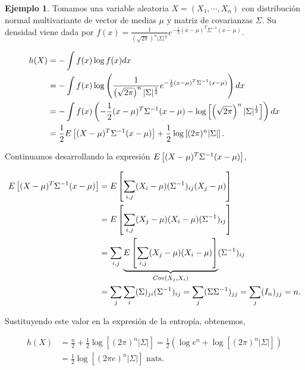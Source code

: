 \documentclass[10pt,a4paper]{article} %
\let\mathbb\relax
\theoremstyle{definition}
\newtheorem{example}[theorem]{Ejemplo}
\begin{document}
\begin{example}\label{ej:norm_multi}
  Tomamos una variable aleatoria $X = (X_1,\cdots,X_n)$ con distribución normal multivariante de vector de medias $\mu$ y matriz de covarianzas $\Sigma$. Su densidad viene dada por $f(x) = \frac{1}{\left (\sqrt{2\pi}\right )^n |\Sigma|^{\frac{1}{2}}} e^{-\frac{1}{2}(x-\mu)^T\Sigma^{-1}(x-\mu)}$.

  \begin{align*}
    h(X) &= - \int f(x)\log f(x) dx \\
    &= - \int f(x) \log \left ( \frac{1}{\left ( \sqrt{2\pi} \right )^n |\Sigma|^{\frac{1}{2}}} e^{-\frac{1}{2}(x-\mu)^T\Sigma^{-1}(x-\mu)} \right )dx\\
    &= - \int f(x) \left (- \frac{1}{2}(x-\mu)^T\Sigma^{-1}(x-\mu) - \log\left [ \left (\sqrt{2\pi} \right )^n |\Sigma|^{\frac{1}{2}} \right ]  \right )dx\\
    &= \frac{1}{2} \mathbb{E}\left [ (X-\mu)^T\Sigma^{-1}(x-\mu) \right ] + \frac{1}{2}\log\left [(2\pi)^n|\Sigma|\right ].
  \end{align*}

  Continuamos desarrollando la expresión $\mathbb{E}\left [ (X-\mu)^T\Sigma^{-1}(x-\mu) \right ]$,

  \begin{align*}
    \mathbb{E}\left [ (X-\mu)^T\Sigma^{-1}(x-\mu) \right ] &= \mathbb{E}\left [ \sum_{i,j}(X_i - \mu)(\Sigma^{-1})_{ij}(X_j-\mu)\right ]\\
    &= \mathbb{E}\left[ \sum_{i,j}(X_j-\mu)(X_i-\mu)(\Sigma^{-1})_{ij}\right]\\
    &= \sum_{i,j}\underbrace{\mathbb{E}\left[ \sum_{i,j}(X_j-\mu)(X_i-\mu)\right]}_{Cov(X_j,X_i)}(\Sigma^{-1})_{ij}\\
    &= \sum_j\sum_i(\Sigma)_{ji}(\Sigma^{-1})_{ij} = \sum_j (\Sigma\Sigma^{-1})_{jj} = \sum_j (I_n)_{jj} = n.
  \end{align*}

  Sustituyendo este valor en la expresión de la entropía, obtenemos,

  \begin{align*}
    h(X) &= \frac{n}{2} + \frac{1}{2}\log\left [ (2\pi)^n|\Sigma|\right ] = \frac{1}{2} \left (\log e^n + \log \left[(2\pi)^n|\Sigma|\right] \right)\\
    &= \frac{1}{2}\log\left[(2\pi e)^n|\Sigma|\right] \text{ nats.}
  \end{align*}

  
\end{example}
\end{document}
